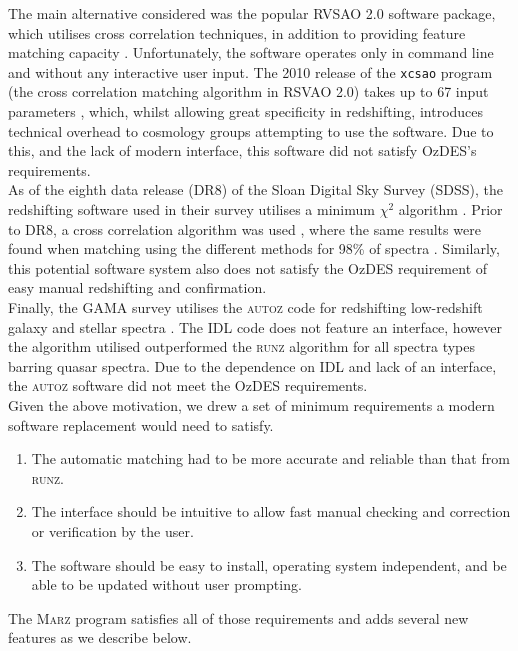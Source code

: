 \documentclass[iop]{emulateapj}
\newcommand{\runz}{\textsc{runz}}
\newcommand{\autoz}{\textsc{autoz}}
\newcommand{\marz}{\textsc{Marz}}
\begin{document}
The main alternative considered was the popular RVSAO 2.0 software package, which utilises cross correlation techniques, in addition to providing feature matching capacity \citep{kurtz1998rvsao}. Unfortunately, the software operates only in command line and without any interactive user input. The 2010 release of the \verb+xcsao+ program (the cross correlation matching algorithm in RSVAO 2.0) takes up to 67 input parameters \citep{parameters}, which, whilst allowing great specificity in redshifting, introduces technical overhead to cosmology groups attempting to use the software. Due to this, and the lack of modern interface, this software did not satisfy OzDES's requirements.\\

As of the eighth data release (DR8) of the Sloan Digital Sky Survey (SDSS), the redshifting software used in their survey utilises a minimum $\chi^2$ algorithm \citep{aihara2011eighth}. Prior to DR8, a cross correlation algorithm was used  \citep{sdss6}, where the same results were found when matching using the different methods for 98\% of spectra \cite{aihara2011eighth}. Similarly, this potential software system also does not satisfy the OzDES requirement of easy manual redshifting and confirmation.\\

Finally, the GAMA survey utilises the \autoz{} code for redshifting low-redshift galaxy and stellar spectra \citep{baldry2014galaxy}. The IDL code does not feature an interface, however the algorithm utilised outperformed the \runz{} algorithm for all spectra types barring quasar spectra. Due to the dependence on IDL and lack of an interface, the \autoz{} software did not meet the OzDES requirements. \\

Given the above motivation, we drew a set of minimum requirements a modern software replacement would need to satisfy.
\begin{enumerate}
\item The automatic matching had to be more accurate and reliable than that from \runz{}.
\item The interface should be intuitive to allow fast manual checking and correction or verification by the user.
\item The software should be easy to install, operating system independent, and be able to be updated without user prompting.
\end{enumerate}
The \marz{} program satisfies all of those requirements and adds several new features as we describe below.
\end{document}
